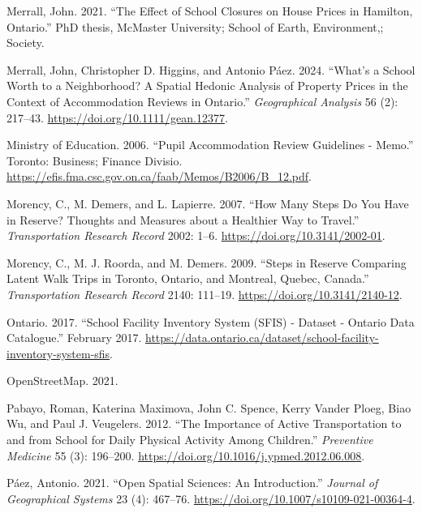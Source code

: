 \documentclass[
default
]{sn-jnl}
\newlength{\cslhangindent}
\newenvironment{CSLReferences}[2] %
 {\begin{list}{}{%
  \setlength{\itemindent}{0pt}
  \setlength{\leftmargin}{0pt}
  \setlength{\parsep}{0pt}
  \ifodd #1
   \setlength{\leftmargin}{\cslhangindent}
   \setlength{\itemindent}{-1\cslhangindent}
  \fi
  \setlength{\itemsep}{#2\baselineskip}}}
 {\end{list}}
\begin{document}
\begin{CSLReferences}{1}{0}
Merrall, John. 2021. {``The Effect of School Closures on House Prices in
Hamilton, Ontario.''} PhD thesis, McMaster University; School of Earth,
Environment,; Society.

Merrall, John, Christopher D. Higgins, and Antonio Páez. 2024. {``What's
a School Worth to a Neighborhood? {A} Spatial Hedonic Analysis of
Property Prices in the Context of Accommodation Reviews in Ontario.''}
\emph{Geographical Analysis} 56 (2): 217--43.
\url{https://doi.org/10.1111/gean.12377}.

Ministry of Education. 2006. {``Pupil Accommodation Review Guidelines -
Memo.''} Toronto: Business; Finance Divisio.
\url{https://efis.fma.csc.gov.on.ca/faab/Memos/B2006/B_12.pdf}.

Morency, C., M. Demers, and L. Lapierre. 2007. {``How Many Steps Do You
Have in Reserve? {Thoughts} and Measures about a Healthier Way to
Travel.''} \emph{Transportation Research Record} 2002: 1--6.
\url{https://doi.org/10.3141/2002-01}.

Morency, C., M. J. Roorda, and M. Demers. 2009. {``Steps in {Reserve
Comparing Latent Walk Trips} in {Toronto}, {Ontario}, and {Montreal},
{Quebec}, {Canada}.''} \emph{Transportation Research Record} 2140:
111--19. \url{https://doi.org/10.3141/2140-12}.

Ontario. 2017. {``School Facility Inventory System ({SFIS}) - Dataset -
Ontario Data Catalogue.''} February 2017.
\url{https://data.ontario.ca/dataset/school-facility-inventory-system-sfis}.

OpenStreetMap. 2021.

Pabayo, Roman, Katerina Maximova, John C. Spence, Kerry Vander Ploeg,
Biao Wu, and Paul J. Veugelers. 2012. {``The Importance of Active
Transportation to and from School for Daily Physical Activity Among
Children.''} \emph{Preventive Medicine} 55 (3): 196--200.
\url{https://doi.org/10.1016/j.ypmed.2012.06.008}.

Páez, Antonio. 2021. {``Open Spatial Sciences: An Introduction.''}
\emph{Journal of Geographical Systems} 23 (4): 467--76.
\url{https://doi.org/10.1007/s10109-021-00364-4}.


\end{CSLReferences}
\end{document}
